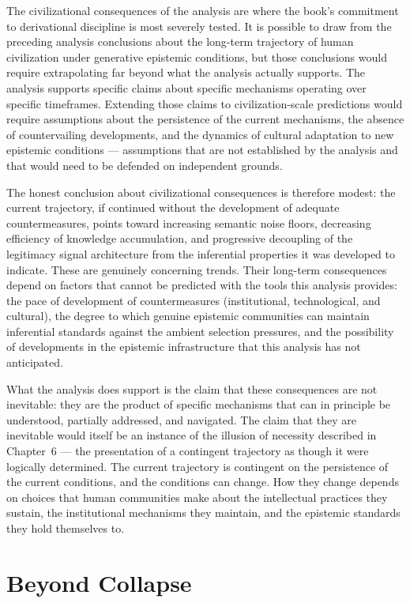 \documentclass[12pt, openright, twoside]{book}
\begin{document}
The civilizational consequences of the analysis are where the book's
commitment to derivational discipline is most severely tested. It is
possible to draw from the preceding analysis conclusions about the
long-term trajectory of human civilization under generative epistemic
conditions, but those conclusions would require extrapolating far beyond
what the analysis actually supports. The analysis supports specific
claims about specific mechanisms operating over specific timeframes.
Extending those claims to civilization-scale predictions would require
assumptions about the persistence of the current mechanisms, the absence
of countervailing developments, and the dynamics of cultural adaptation
to new epistemic conditions --- assumptions that are not established by
the analysis and that would need to be defended on independent grounds.

The honest conclusion about civilizational consequences is therefore
modest: the current trajectory, if continued without the development
of adequate countermeasures, points toward increasing semantic noise
floors, decreasing efficiency of knowledge accumulation, and progressive
decoupling of the legitimacy signal architecture from the inferential
properties it was developed to indicate. These are genuinely concerning
trends. Their long-term consequences depend on factors that cannot be
predicted with the tools this analysis provides: the pace of development
of countermeasures (institutional, technological, and cultural), the
degree to which genuine epistemic communities can maintain inferential
standards against the ambient selection pressures, and the possibility
of developments in the epistemic infrastructure that this analysis has
not anticipated.

What the analysis does support is the claim that these consequences
are not inevitable: they are the product of specific mechanisms that
can in principle be understood, partially addressed, and navigated.
The claim that they are inevitable would itself be an instance of the
illusion of necessity described in Chapter~6 --- the presentation of
a contingent trajectory as though it were logically determined. The
current trajectory is contingent on the persistence of the current
conditions, and the conditions can change. How they change depends on
choices that human communities make about the intellectual practices
they sustain, the institutional mechanisms they maintain, and the
epistemic standards they hold themselves to.

\chapter{Beyond Collapse}
\end{document}
